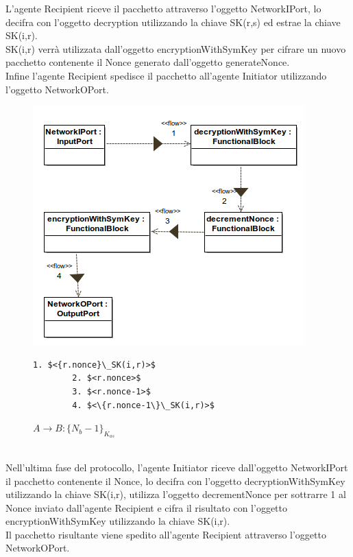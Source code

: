 \newpage
\noindent L'agente Recipient riceve il pacchetto attraverso l'oggetto NetworkIPort, lo decifra con l'oggetto decryption utilizzando la chiave SK(r,s) ed estrae la chiave SK(i,r).\\ 
SK(i,r) verrà utilizzata dall'oggetto encryptionWithSymKey per cifrare un nuovo pacchetto contenente il Nonce generato dall'oggetto generateNonce.\\ 
Infine l'agente Recipient spedisce il pacchetto all'agente Initiator utilizzando l'oggetto NetworkOPort.\\
\begin{figure}[h!] 
    \centering 
    \includegraphics[scale=0.6]{img/NSSK/ThirdMessage.png} 
    \begin{lstlisting}[frame=single, mathescape, basicstyle=\footnotesize]
        1. $<{r.nonce}\_SK(i,r)>$
        2. $<r.nonce>$
        3. $<r.nonce-1>$
        4. $<\{r.nonce-1\}\_SK(i,r)>$
    \end{lstlisting}
    \caption{$A \rightarrow B : \{N_b-1\}_{K_{as}}$} 
\end{figure}\\
\noindent Nell'ultima fase del protocollo, l'agente Initiator riceve dall'oggetto NetworkIPort il pacchetto contenente il Nonce, lo decifra con l'oggetto decryptionWithSymKey utilizzando la chiave SK(i,r), utilizza l'oggetto decrementNonce per sottrarre 1 al Nonce inviato dall'agente Recipient e cifra il risultato con l'oggetto encryptionWithSymKey utilizzando la chiave SK(i,r).\\
Il pacchetto risultante viene spedito all'agente Recipient attraverso l'oggetto NetworkOPort.\\

